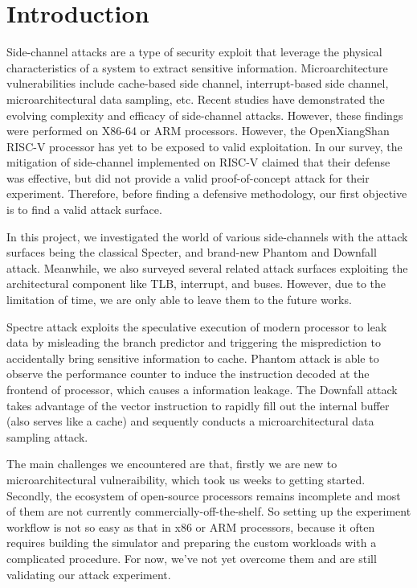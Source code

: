 \section{Introduction}

Side-channel attacks are a type of security exploit that
leverage the physical characteristics of a system to extract sensitive information.
Microarchitecture vulnerabilities include cache-based side channel,
interrupt-based side channel, microarchitectural data sampling, etc. 
Recent studies have demonstrated the evolving complexity and efficacy
of side-channel attacks. However, these findings were performed on X86-64
or ARM processors. However, the OpenXiangShan RISC-V processor has yet to
be exposed to valid exploitation. In our survey, the mitigation
of side-channel implemented on RISC-V claimed that their defense was effective, but did not provide a valid proof-of-concept attack for their experiment. Therefore,
before finding a defensive methodology, our first objective is to find a valid
attack surface.

In this project, we investigated the world of various side-channels with
the attack surfaces being the classical Specter, and brand-new Phantom and Downfall attack. Meanwhile, we also surveyed several related attack surfaces exploiting the architectural component like TLB, interrupt, and buses. However, due to the limitation of time, we are only able to leave them to the future works.

Spectre attack exploits the speculative execution of modern processor to leak data
by misleading the branch predictor and triggering the misprediction to accidentally bring sensitive information to cache. Phantom attack is able to observe the performance counter to induce the instruction decoded at the frontend of processor, which causes a information leakage. The Downfall attack takes advantage of the vector instruction to rapidly fill out the internal buffer (also serves like a cache) and sequently conducts a microarchitectural data sampling attack.

The main challenges we encountered are that, firstly we are new to microarchitectural vulneraibility, which took us weeks to getting started. Secondly, the ecosystem of open-source processors remains incomplete and most of them are not currently commercially-off-the-shelf. So setting up the experiment workflow is not so easy as that in x86 or ARM processors, because it often requires building the simulator and preparing the custom workloads with a complicated procedure. For now, we've not yet overcome them and are still validating our attack experiment.